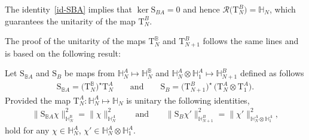 The identity~\eqref{id-SBA} implies that $\ker \mathrm S_{BA}=0$ and hence $\mathcal R\big(\mathrm T_N^B\big)=\mathbb H_N$, which guarantees the
unitarity of the map $\mathrm T_N^B$.

The proof of the unitarity of the maps $\mathrm T_N^{\mathbb B}$ and $\mathrm T_{N+1}^B$ follows the same lines and is based on the
following result:

\begin{Lemma}\label{lemma:SBBA}
Let $\mathrm S_{\mathbb B A}$ and $\mathrm S_{B}$ be maps from $\mathbb H_N^A \mapsto \mathbb H^{\mathbb B}_N$ and
$\mathbb H^{A}_N\otimes \mathbb H_{1}^A \mapsto \mathbb H^{B}_{N+1}$ defined as follows
\begin{gather*}
\mathrm S_{\mathbb B A}=\big(\mathrm T_N^{\mathbb B}\big)^{\star} \mathrm T_N^{A}\qquad \text{and}\qquad
\mathrm S_{B}=\big(\mathrm T_{N+1}^{B}\big)^{\star}\,
\big(\mathrm T_{N}^A\otimes \mathrm T_1^A\big).
\end{gather*}
Provided the map $\mathrm T_N^A\colon \mathbb H^{A}_N \mapsto \mathbb H_N$ is unitary the following identities,
\begin{gather*}
\|\mathrm S_{\mathbb B A}\chi\|^2_{\mathbb H_N^{\mathbb B}}=\|\chi\|^2_{\mathbb H_N^A}
\qquad \text{and} \qquad
\|\mathrm S_{B }\chi'\|^2_{\mathbb H_{N+1}^{ B}}=\|\chi'\|^2_{\mathbb H_N^A\otimes \mathbb H_1^A},
\end{gather*}
hold for any $\chi\in\mathbb H_N^A$, $\chi'\in \mathbb H_N^A\otimes \mathbb H_1^A$.
\end{Lemma}

